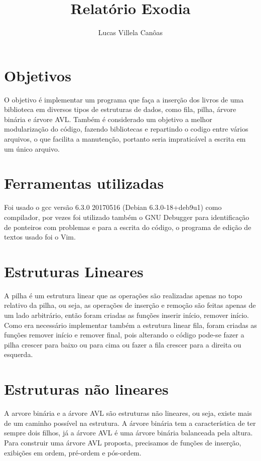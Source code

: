 \documentclass[11pt]{article}
\title{\textbf{Relatório Exodia}}
\author{Lucas Villela Canôas}
\date{}
\begin{document}
\maketitle

\section{Objetivos}

O objetivo é implementar um programa que faça a inserção dos livros de uma biblioteca em diversos tipos de estruturas de dados, como fila, pilha, árvore binária e árvore AVL.
Também é considerado um objetivo a melhor modularização do código, fazendo bibliotecas e repartindo o codigo entre vários arquivos, o que facilita a manutenção, portanto seria impraticável a escrita em um único arquivo.

\section {Ferramentas utilizadas}

Foi usado o gcc versão 6.3.0 20170516 (Debian 6.3.0-18+deb9u1) como compilador, por vezes foi utilizado também o GNU Debugger para identificação de ponteiros com problemas e para a escrita do código, o programa de edição de textos usado foi o Vim.


\section {Estruturas Lineares}

A pilha é um estrutura linear que as operações são realizadas apenas no topo relativo da pilha, ou seja, as operações de inserção e remoção são feitas apenas de um lado arbitrário, então foram criadas as funções inserir início, remover início. Como era necessário implementar também a estrutura linear fila, foram criadas as funções remover início e remover final, pois alterando o código pode-se fazer a pilha crescer para baixo ou para cima ou fazer a fila crescer para a direita ou esquerda.

\section {Estruturas não lineares}

A arvore binária e a árvore AVL são estruturas não lineares, ou seja, existe mais de um caminho possível na estrutura. A árvore binária tem a característica de ter sempre dois filhos, já a árvore AVL é uma árvore binária balanceada pela altura. Para construir uma árvore AVL proposta, precisamos de funções de inserção, exibições em ordem, pré-ordem e pós-ordem.
\end{document}
